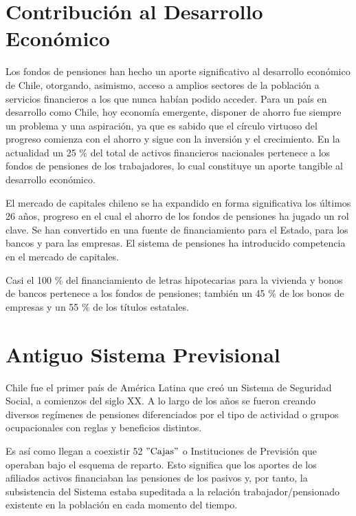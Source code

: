 \section{Contribuci\'on al Desarrollo Econ\'omico}

Los fondos de pensiones han hecho un aporte significativo al desarrollo
econ\'omico de Chile, otorgando, asimismo, acceso a amplios sectores de la
poblaci\'on a servicios financieros a los que nunca hab\'ian podido acceder.
Para un pa\'is en desarrollo como Chile, hoy econom\'ia emergente, disponer de
ahorro fue siempre un problema y una aspiraci\'on, ya que es sabido que el
c\'irculo virtuoso del progreso comienza con el ahorro y sigue con la inversi\'on y
el crecimiento. En la actualidad un 25 $\%$ del total de activos financieros
nacionales pertenece a los fondos de pensiones de los trabajadores, lo cual
constituye un aporte tangible al desarrollo econ\'omico.

El mercado de capitales chileno se ha expandido en forma significativa los
\'ultimos 26 a\~nos, progreso en el cual el ahorro de los fondos de pensiones ha
jugado un rol clave. Se han convertido en una fuente de financiamiento para el
Estado, para los bancos y para las empresas. El sistema de pensiones ha
introducido competencia en el mercado de capitales.

Casi el 100 $\%$ del financiamiento de letras hipotecarias para la vivienda y bonos
de bancos pertenece a los fondos de pensiones; tambi\'en un 45 $\%$ de los bonos
de empresas y un 55 $\%$ de los t\'itulos estatales.

\section{Antiguo Sistema Previsional}

Chile fue el primer pa\'is de Am\'erica Latina que cre\'o un Sistema de Seguridad Social, a comienzos del siglo XX. A lo largo de los a\~{n}os se fueron creando diversos reg\'imenes de pensiones diferenciados por el tipo de actividad o grupos ocupacionales con reglas y beneficios distintos.

Es as\'i como llegan a coexistir 52 $"\mbox{Cajas}"$ o Instituciones de Previsi\'on que operaban bajo el esquema de reparto. Esto significa que los aportes de los afiliados activos financiaban las pensiones de los pasivos y, por tanto, la subsistencia del Sistema estaba supeditada a la relaci\'on trabajador/pensionado existente en la poblaci\'on en cada momento del tiempo.


